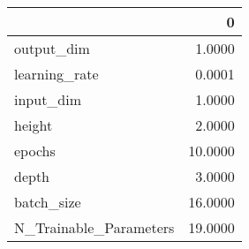 \begin{tabular}{lr}
\toprule
{} &        0 \\
\midrule
output\_dim             &   1.0000 \\
learning\_rate          &   0.0001 \\
input\_dim              &   1.0000 \\
height                 &   2.0000 \\
epochs                 &  10.0000 \\
depth                  &   3.0000 \\
batch\_size             &  16.0000 \\
N\_Trainable\_Parameters &  19.0000 \\
\bottomrule
\end{tabular}
